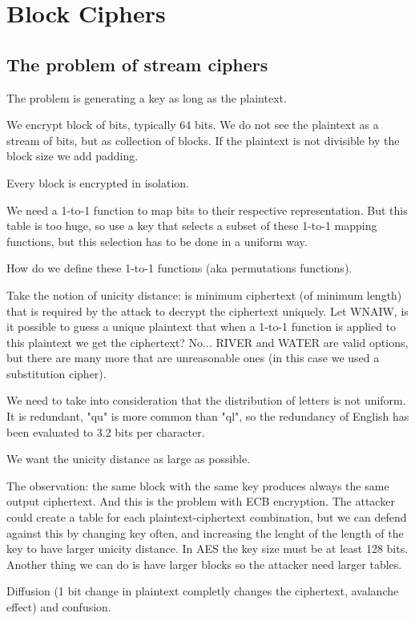 \chapter{Block Ciphers}

\section{The problem of stream ciphers}

The problem is generating a key as long as the plaintext.

We encrypt block of bits, typically 64 bits. We do not see the plaintext as a stream of bits, but as collection of blocks. If the plaintext is not divisible by the block size we add padding.

Every block is encrypted in isolation.

We need a 1-to-1 function to map bits to their respective representation. But this table is too huge, so use a key that selects a subset of these 1-to-1 mapping functions, but this selection has to be done in a uniform way.

How do we define these 1-to-1 functions (aka permutations functions).

Take the notion of unicity distance: is minimum ciphertext (of minimum length) that is required by the attack to decrypt the ciphertext uniquely.
Let WNAIW, is it possible to guess a unique plaintext that when a 1-to-1 function is applied to this plaintext we get the ciphertext? No... RIVER and WATER are valid options, but there are many more that are unreasonable ones (in this case we used a substitution cipher).

We need to take into consideration that the distribution of letters is not uniform. It is redundant, "qu" is more common than "ql", so the redundancy of English has been evaluated to 3.2 bits per character.


We want the unicity distance as large as possible.

The observation: the same block with the same key produces always the same output ciphertext. And this is the problem with ECB encryption. The attacker could create a table for each plaintext-ciphertext combination, but we can defend against this by changing key often, and increasing the lenght of the length of the key to have larger unicity distance. In AES the key size must be at least 128 bits.
Another thing we can do is have larger blocks so the attacker need larger tables.


Diffusion (1 bit change in plaintext completly changes the ciphertext, avalanche effect) and confusion.


